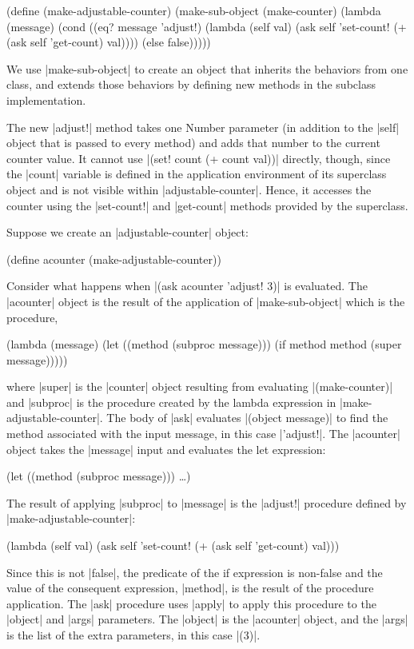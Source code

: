\begin{schemeregion}
\begin{schemedisplay}
(define (make-adjustable-counter)
  (make-sub-object
   (make-counter)
   (lambda (message)
     (cond 
      ((eq? message 'adjust!) 
       (lambda (self val) 
         (ask self 'set-count! (+ (ask self 'get-count) val))))
       (else false)))))
\end{schemedisplay}          

We use \scheme|make-sub-object| to create an object that inherits the behaviors from one class, and extends those behaviors by defining new methods in the subclass implementation.  

The new \scheme|adjust!| method takes one Number parameter (in addition to the \scheme|self| object that is passed to every method) and adds that number to the current counter value.  It cannot use \scheme|(set! count (+ count val))| directly, though, since the \scheme|count| variable is defined in the application environment of its superclass object and is not visible within \scheme|adjustable-counter|.  Hence, it accesses the counter using the \scheme|set-count!| and \scheme|get-count| methods provided by the superclass.

Suppose we create an \scheme|adjustable-counter| object:
\begin{schemedisplay}
(define acounter (make-adjustable-counter))
\end{schemedisplay}
Consider what happens when \scheme|(ask acounter 'adjust! 3)| is evaluated.  The \scheme|acounter| object is the result of the application of \scheme|make-sub-object| which is the procedure,
\begin{schemedisplay}
(lambda (message)
  (let ((method (subproc message)))
    (if method method (super message)))))
\end{schemedisplay}
where \scheme|super| is the \scheme|counter| object resulting from evaluating \scheme|(make-counter)| and \scheme|subproc| is the procedure created by the lambda expression in \scheme|make-adjustable-counter|.  The body of \scheme|ask| evaluates \scheme|(object message)| to find the method associated with the input message, in this case \scheme|'adjust!|.  The \scheme|acounter| object takes the \scheme|message| input and evaluates the let expression: 
\begin{schemedisplay}
(let ((method (subproc message))) \ldots)
\end{schemedisplay}  
The result of applying \scheme|subproc| to \scheme|message| is the \scheme|adjust!| procedure defined by \scheme|make-adjustable-counter|: 
\begin{schemedisplay}
(lambda (self val) 
  (ask self 'set-count! (+ (ask self 'get-count) val)))
\end{schemedisplay}
Since this is not \schemeresult|false|, the predicate of the if expression is non-false and the value of the consequent expression, \scheme|method|, is the result of the procedure application.  The \scheme|ask| procedure uses \scheme|apply| to apply this procedure to the \scheme|object| and \scheme|args| parameters.  The \scheme|object| is the \scheme|acounter| object, and the \scheme|args| is the list of the extra parameters, in this case \scheme|(3)|.


\end{schemeregion}
